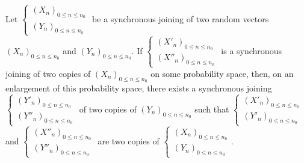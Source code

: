 \documentclass[12pt,a4paper]{article}
\begin{document}
\begin{lemma}
Let 
$\left\{\begin{smallmatrix} {(X_n)}_{0 \leq n \leq n_0} \\ 
{(Y_n)}_{0 \leq n \leq n_0}
\end{smallmatrix}\right.$  
be a synchronous joining of two random vectors 
${(X_n)}_{0 \leq n \leq n_0}$ and ${(Y_n)}_{0 \leq n \leq n_0}$. 
If 
$\left\{\begin{smallmatrix} {(X'_n)}_{0 \leq n \leq n_0} \\ 
{(X''_n)}_{0 \leq n \leq n_0}
\end{smallmatrix}\right.$
is a synchronous joining of two copies of ${(X_n)}_{0 \leq n \leq n_0}$ 
on some probability space,  
then, on an enlargement of this probability space, there 
exists a synchronous joining 
$\left\{\begin{smallmatrix} {(Y'_n)}_{0 \leq n \leq n_0} \\ 
{(Y''_n)}_{0 \leq n \leq n_0}
\end{smallmatrix}\right.$
of two copies of ${(Y_n)}_{0 \leq n \leq n_0}$ 
such that  
$\left\{\begin{smallmatrix} {(X'_n)}_{0 \leq n \leq n_0} \\ 
{(Y'_n)}_{0 \leq n \leq n_0}
\end{smallmatrix}\right.$ and 
$\left\{\begin{smallmatrix} {(X''_n)}_{0 \leq n \leq n_0} \\ 
{(Y''_n)}_{0 \leq n \leq n_0}
\end{smallmatrix}\right.$
are two copies of 
$\left\{\begin{smallmatrix} {(X_n)}_{0 \leq n \leq n_0} \\ 
{(Y_n)}_{0 \leq n \leq n_0}
\end{smallmatrix}\right.$.
\end{lemma}
\end{document}
